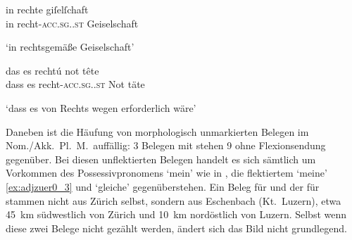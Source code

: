 \begin{exe}
\ex \label{ex:adjzuere}
	\begin{xlist}
	\ex \label{ex:adjzuere_1}
		\gll in rechte giſelſchaft \\
			in recht-\textsc{acc.sg.\FemI.st} Geiselschaft \\
		\begin{taggedline}{\parencites(Zürich, 1256 und 1272)[\pno~35, 66.31]{cao1}[\pno~188, 204.31]{cao1}}
		\trans `in rechtsgemäße Geiselschaft'
		\end{taggedline}

	\ex \label{ex:adjzuere_3}
		\gll das es rechtú not tête \\
			dass es recht-\textsc{acc.sg.\FemI.st} Not täte \\
		\begin{taggedline}{\parencites(Zürich, 1292 und 1292/93)[\pno~1591, 731.3]{cao2}[\pno~1756, 67.26--27]{cao3}}
		\trans `dass es von Rechts wegen erforderlich wäre'
		\end{taggedline}
	\end{xlist}
\end{exe}

Daneben ist die Häufung von morphologisch unmarkierten Belegen im Nom./Akk.\
Pl.\ M.\ auffällig: 3 Belegen mit  stehen 9 ohne Flexionsendung
gegenüber. Bei diesen unflektierten Belegen handelt es sich sämtlich um
Vorkommen des Possessivpronomens \norm{mīn} `mein' wie in
, die flektiertem 
`meine' \cref{ex:adjzuer0_3} und \norm{geliche} `gleiche'
gegenüberstehen. Ein Beleg für  und der für  stammen nicht
aus Zürich selbst, sondern aus Eschenbach (Kt.~Luzern), etwa 45~km südwestlich
von Zürich und 10~km nordöstlich von Luzern. Selbst wenn diese zwei Belege
nicht gezählt werden, ändert sich das Bild nicht grundlegend.

